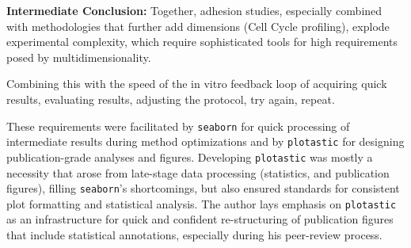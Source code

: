 




\textbf{Intermediate Conclusion:} Together, adhesion studies, especially
combined with methodologies that further add dimensions (Cell Cycle profiling),
explode experimental complexity, which require sophisticated tools for high
requirements posed by multidimensionality.

Combining this with the speed of the in vitro feedback loop of acquiring quick results,
evaluating results, adjusting the protocol, try again, repeat. 


These requirements were facilitated by \texttt{seaborn} for quick processing of
intermediate results during method optimizations and by \texttt{plotastic} for
designing publication-grade analyses and figures. Developing \texttt{plotastic}
was mostly a necessity that arose from late-stage data processing (statistics,
and publication figures), filling \texttt{seaborn}'s shortcomings, but also
ensured standards for consistent plot formatting and statistical analysis. The
author lays emphasis on \texttt{plotastic} as an infrastructure for quick and
confident re-structuring of publication figures that include statistical
annotations, especially during his peer-review process.





